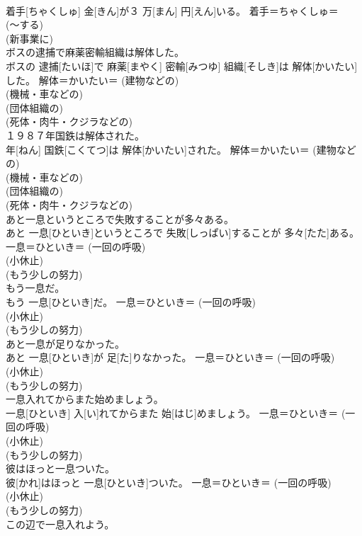 \documentclass[8pt]{extreport}
\begin{document}
\begin{CJK}{UTF8}{min}
{\\	着手[ちゃくしゅ] 金[きん]が３ 万[まん] 円[えん]いる。	着手＝ちゃくしゅ＝ 
\\	(〜する) 
\\	(新事業に) 
\\	ボスの逮捕で麻薬密輸組織は解体した。	
\\	ボスの 逮捕[たいほ]で 麻薬[まやく] 密輸[みつゆ] 組織[そしき]は 解体[かいたい]した。	解体＝かいたい＝ (建物などの) 
\\	(機械・車などの) 
\\	(団体組織の) 
\\	(死体・肉牛・クジラなどの) 
\\	１９８７年国鉄は解体された。	
\\	年[ねん] 国鉄[こくてつ]は 解体[かいたい]された。	解体＝かいたい＝ (建物などの) 
\\	(機械・車などの) 
\\	(団体組織の) 
\\	(死体・肉牛・クジラなどの) 
\\	あと一息というところで失敗することが多々ある。	
\\	あと 一息[ひといき]というところで 失敗[しっぱい]することが 多々[たた]ある。	一息＝ひといき＝ (一回の呼吸) 
\\	(小休止) 
\\	(もう少しの努力) 
\\	もう一息だ。	
\\	もう 一息[ひといき]だ。	一息＝ひといき＝ (一回の呼吸) 
\\	(小休止) 
\\	(もう少しの努力) 
\\	あと一息が足りなかった。	
\\	あと 一息[ひといき]が 足[た]りなかった。	一息＝ひといき＝ (一回の呼吸) 
\\	(小休止) 
\\	(もう少しの努力) 
\\	一息入れてからまた始めましょう。	
\\	一息[ひといき] 入[い]れてからまた 始[はじ]めましょう。	一息＝ひといき＝ (一回の呼吸) 
\\	(小休止) 
\\	(もう少しの努力) 
\\	彼はほっと一息ついた。	
\\	彼[かれ]はほっと 一息[ひといき]ついた。	一息＝ひといき＝ (一回の呼吸) 
\\	(小休止) 
\\	(もう少しの努力) 
\\	この辺で一息入れよう。	
}
\end{CJK}
\end{document}
